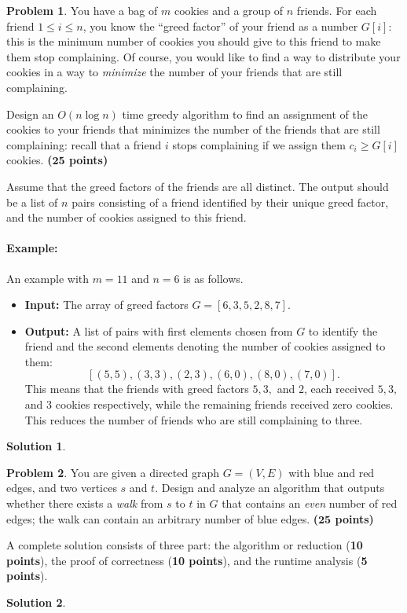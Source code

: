 \documentclass{article}
\theoremstyle{definition}
\newtheorem{problem}{Problem}
\newtheorem*{solution*}{Solution}
\newenvironment{solution}{\begin{solution*}}{{} \end{solution*}}
\newcommand{\grade}[1]{\hfill{\textbf{($\mathbf{#1}$ points)}}}
\begin{document}
\newpage


\begin{problem}\label{greedy}
	You have a bag of $m$ cookies and a group of $n$ friends. For each friend $1 \leq i \leq n$, you know the ``greed factor'' of your friend as a number $G[i]$:
	this is the minimum number of cookies you should give to this friend to make them stop complaining. Of course, you would like to find a way to distribute your cookies in a way to \emph{minimize} the number of your friends that are still complaining. 
	
	Design an $O(n\log{n})$ time greedy algorithm to find an assignment of the cookies to your friends that minimizes the number of the friends that are still complaining: 
	recall that a friend $i$ stops complaining if we assign them $c_i \geq G[i]$ cookies. \grade{25}
	
	Assume that the greed factors of the friends are all distinct. The output should be a list of $n$ pairs consisting of a friend identified by their unique greed factor, and the number of cookies assigned to this friend. 

\paragraph{Example:} An example with $m=11$ and $n=6$ is as follows. 
\begin{itemize}
	\item \textbf{Input:} The array of greed factors $G=[6,3,5,2,8,7]$.
	\item \textbf{Output:} A list of pairs with first elements chosen from $G$ to identify the friend and the second elements denoting the number of cookies assigned to them: 
	\[
		[(5,5),(3,3),(2,3),(6,0),(8,0),(7,0)].
	\]
	This means that the friends
	with greed factors $5,3,$ and $2$, each received $5,3,$ and $3$ cookies respectively, while the remaining friends received zero cookies. This reduces the number of friends who are still complaining to three. 
\end{itemize}
\end{problem}

\begin{solution}

\end{solution}
	

\newpage


\begin{problem}\label{search}
	You are given a directed graph $G=(V,E)$ with blue and red edges, and two vertices $s$ and $t$. Design and analyze an algorithm that outputs 
	whether there exists a \emph{walk} from $s$ to $t$ in $G$ that contains an \emph{even} number of red edges; the walk can contain an arbitrary number of blue edges.  \grade{25}
	
	A complete solution consists of three part: the algorithm or reduction (\textbf{10 points}), the proof of correctness (\textbf{10 points}), 
	and the runtime analysis (\textbf{5 points}). 
\end{problem}
\begin{solution}

\end{solution}
	
\end{document}
